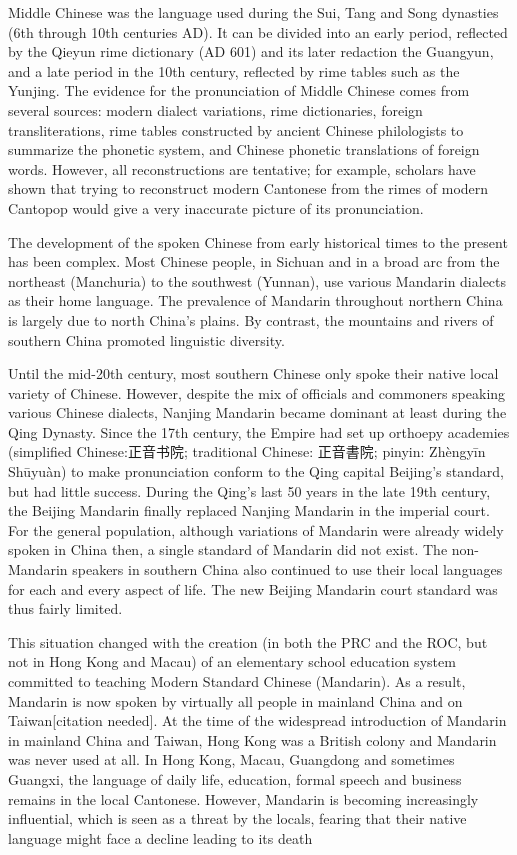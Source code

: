 Middle Chinese was the language used during the Sui, Tang and Song dynasties (6th through 10th centuries AD). It can be divided into an early period, reflected by the Qieyun rime dictionary (AD 601) and its later redaction the Guangyun, and a late period in the 10th century, reflected by rime tables such as the Yunjing. The evidence for the pronunciation of Middle Chinese comes from several sources: modern dialect variations, rime dictionaries, foreign transliterations, rime tables constructed by ancient Chinese philologists to summarize the phonetic system, and Chinese phonetic translations of foreign words. However, all reconstructions are tentative; for example, scholars have shown that trying to reconstruct modern Cantonese from the rimes of modern Cantopop would give a very inaccurate picture of its pronunciation.

The development of the spoken Chinese from early historical times to the present has been complex. Most Chinese people, in Sichuan and in a broad arc from the northeast (Manchuria) to the southwest (Yunnan), use various Mandarin dialects as their home language. The prevalence of Mandarin throughout northern China is largely due to north China's plains. By contrast, the mountains and rivers of southern China promoted linguistic diversity.

Until the mid-20th century, most southern Chinese only spoke their native local variety of Chinese. However, despite the mix of officials and commoners speaking various Chinese dialects, Nanjing Mandarin became dominant at least during the Qing Dynasty. Since the 17th century, the Empire had set up orthoepy academies (simplified Chinese:{\cjk 正音书院}; traditional Chinese: {\cjk 正音書院}; pinyin: Zhèngyīn Shūyuàn) to make pronunciation conform to the Qing capital Beijing's standard, but had little success. During the Qing's last 50 years in the late 19th century, the Beijing Mandarin finally replaced Nanjing Mandarin in the imperial court. For the general population, although variations of Mandarin were already widely spoken in China then, a single standard of Mandarin did not exist. The non-Mandarin speakers in southern China also continued to use their local languages for each and every aspect of life. The new Beijing Mandarin court standard was thus fairly limited.

This situation changed with the creation (in both the PRC and the ROC, but not in Hong Kong and Macau) of an elementary school education system committed to teaching Modern Standard Chinese (Mandarin). As a result, Mandarin is now spoken by virtually all people in mainland China and on Taiwan[citation needed]. At the time of the widespread introduction of Mandarin in mainland China and Taiwan, Hong Kong was a British colony and Mandarin was never used at all. In Hong Kong, Macau, Guangdong and sometimes Guangxi, the language of daily life, education, formal speech and business remains in the local Cantonese. However, Mandarin is becoming increasingly influential, which is seen as a threat by the locals, fearing that their native language might face a decline leading to its death





